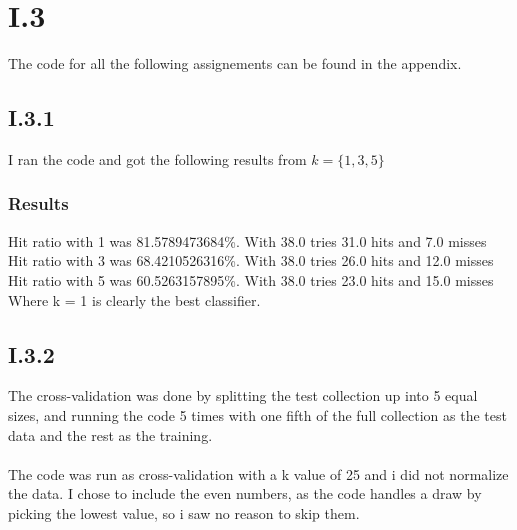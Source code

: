 \documentclass{article}
\begin{document}
\inputminted{matlab}{part1/i24john.m}


\section{I.3}

The code for all the following assignements can be found in the appendix.

\subsection{I.3.1}
I ran the code and got the following results from $k = \{1,3,5\}$\\
\subsubsection*{Results}
Hit ratio with 1 was {\color{green}81.5789473684\%}. With 38.0 tries 31.0 hits and 7.0 misses\\
Hit ratio with 3 was {\color{yellow}68.4210526316\%}. With 38.0 tries 26.0 hits and 12.0 misses\\
Hit ratio with 5 was {\color{yellow}60.5263157895\%}. With 38.0 tries 23.0 hits and 15.0 misses\\
Where k = 1 is clearly the best classifier.\\

\subsection{I.3.2}
The cross-validation was done by splitting the test collection up into 5 equal sizes, and running the code 5 times with one fifth
of the full collection as the test data and the rest as the training.\\\\
The code was run as cross-validation with a k value of 25 and i did not normalize the data. I chose to include the even numbers,
 as the code handles a draw by picking the lowest value, so i saw no reason to skip them.
\end{document}
